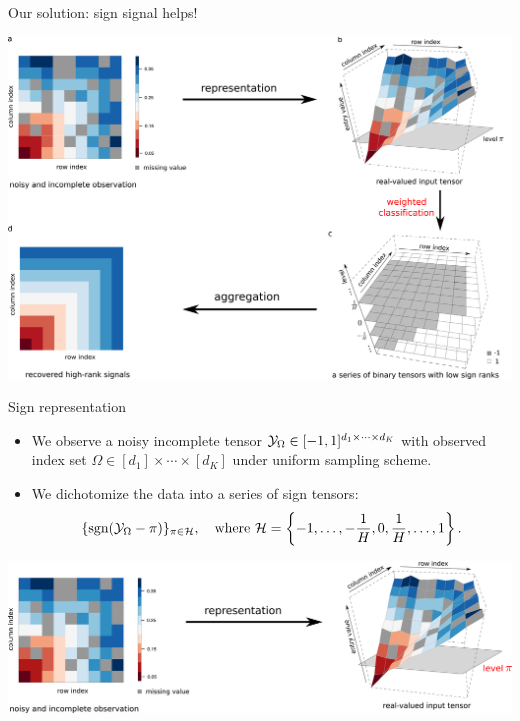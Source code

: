 \documentclass[10pt, mathserif]{beamer} %
\theoremstyle{definition}
\theoremstyle{plain}
\def\sign{\textup{sgn}}
\begin{document}
\begin{frame}{Our solution: sign signal helps!}
     \begin{center}
 \includegraphics[width =\textwidth]{Figures/mainidea.pdf}
         \end{center}
 \end{frame}

\begin{frame}{Sign representation}
\begin{itemize}
    \item We observe {\color{red}a noisy incomplete tensor} $\mathcal{Y}_\Omega\in[-1,1]^{d_1\times \cdots\times d_K}$ with observed index set $\Omega\in[d_1]\times\cdots\times[d_K]$ under uniform sampling scheme. 
    \item We dichotomize the data into {\color{red}a series of sign tensors}:
\[
\{\sign(\tY_\Omega-\pi)\}_{\pi\in \tH}, \quad \text{where}\ \tH=\left\{-1,\ldots, -{1\over H}, 0, {1\over H}, \ldots, 1\right\}. 
\]
\end{itemize}
        
  \begin{center}
    \includegraphics[width =\textwidth]{Figures/representation.pdf}
    \end{center}
\end{frame}
\end{document}
